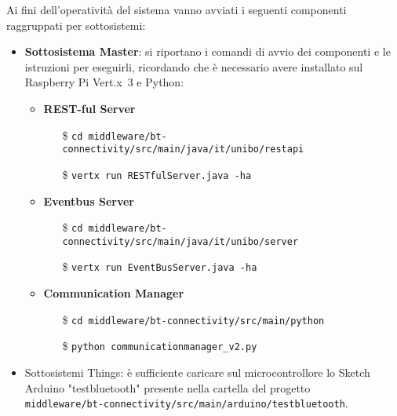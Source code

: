 \documentclass[11pt,a4paper]{article}
\newcommand{\vertx}{Vert.x}
\begin{document}
\noindent Ai fini dell'operativit\`a del sistema vanno avviati i seguenti componenti raggruppati per sottosistemi:

\begin{itemize}

\item \textbf{Sottosistema Master}: si riportano i comandi di avvio dei componenti e le istruzioni per eseguirli, ricordando che \`e necessario avere installato sul Raspberry Pi \vertx \, 3 e Python:
\begin{itemize}

\item \textbf{REST-ful Server}

\begin{itemize}

\item[\$] \texttt{cd middleware/bt-connectivity/src/main/java/it/unibo/restapi}

\item[\$] \texttt{vertx run RESTfulServer.java -ha}

\end{itemize}

\item \textbf{Eventbus Server}

\begin{itemize}

\item[\$] \texttt{cd middleware/bt-connectivity/src/main/java/it/unibo/server}

\item[\$] \texttt{vertx run EventBusServer.java -ha}

\end{itemize}

\item \textbf{Communication Manager}

\begin{itemize}
\item[\$] \texttt{cd middleware/bt-connectivity/src/main/python}

\item[\$] \texttt{python communicationmanager\_v2.py}

\end{itemize}

\end{itemize}

\item Sottosistemi Things: \`e sufficiente caricare sul microcontrollore lo Sketch Arduino "testbluetooth" presente nella cartella del progetto \\\texttt{middleware/bt-connectivity/src/main/arduino/testbluetooth}.

\end{itemize}
\end{document}

